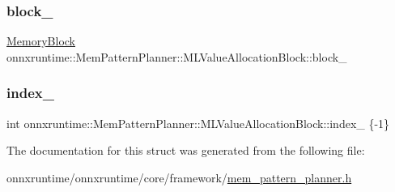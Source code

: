 \subsubsection{\texorpdfstring{block\+\_\+}{block\_}}
{\footnotesize\ttfamily \mbox{\hyperlink{structonnxruntime_1_1MemoryBlock}{Memory\+Block}} onnxruntime\+::\+Mem\+Pattern\+Planner\+::\+M\+L\+Value\+Allocation\+Block\+::block\+\_\+}

\mbox{\label{structonnxruntime_1_1MemPatternPlanner_1_1MLValueAllocationBlock_a4078a06f008df353c8bff3b146ff3fe7}} 
\subsubsection{\texorpdfstring{index\+\_\+}{index\_}}
{\footnotesize\ttfamily int onnxruntime\+::\+Mem\+Pattern\+Planner\+::\+M\+L\+Value\+Allocation\+Block\+::index\+\_\+ \{-\/1\}}



The documentation for this struct was generated from the following file\+:\begin{DoxyCompactItemize}
\item 
onnxruntime/onnxruntime/core/framework/\mbox{\hyperlink{mem__pattern__planner_8h}{mem\+\_\+pattern\+\_\+planner.\+h}}\end{DoxyCompactItemize}
